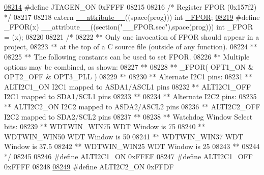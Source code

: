 \begin{DoxyCode}
\hypertarget{a00009_source_l08214}{}\hyperlink{a00009_aa569c0dc426e0de20ed4fccea7a75507}{08214} \textcolor{preprocessor}{#define JTAGEN\_ON            0xFFFF}
08215 
08216 \textcolor{comment}{/* Register FPOR (0x157f2)                               */}
08217 
08218 \textcolor{keyword}{extern} \hyperlink{a00009_a493c46f03454991ccc5aa7a6e1dfb2a7}{\_\_attribute\_\_}((space(prog))) int \hyperlink{a00009_a0d8fae652b4695a239f1ffffaff3f6b5}{\_FPOR};
\hypertarget{a00009_source_l08219}{}\hyperlink{a00009_a0d8fae652b4695a239f1ffffaff3f6b5}{08219} \textcolor{preprocessor}{#define \_FPOR(x) \_\_attribute\_\_((section("\_\_FPOR.sec"),space(prog))) int \_FPOR = (x);}
08220 
08221 \textcolor{comment}{/*}
08222 \textcolor{comment}{** Only one invocation of FPOR should appear in a project,}
08223 \textcolor{comment}{** at the top of a C source file (outside of any function).}
08224 \textcolor{comment}{**}
08225 \textcolor{comment}{** The following constants can be used to set FPOR.}
08226 \textcolor{comment}{** Multiple options may be combined, as shown:}
08227 \textcolor{comment}{**}
08228 \textcolor{comment}{** \_FPOR( OPT1\_ON & OPT2\_OFF & OPT3\_PLL )}
08229 \textcolor{comment}{**}
08230 \textcolor{comment}{**   Alternate I2C1 pins:}
08231 \textcolor{comment}{**     ALTI2C1\_ON           I2C1 mapped to ASDA1/ASCL1 pins}
08232 \textcolor{comment}{**     ALTI2C1\_OFF          I2C1 mapped to SDA1/SCL1 pins}
08233 \textcolor{comment}{**}
08234 \textcolor{comment}{**   Alternate I2C2 pins:}
08235 \textcolor{comment}{**     ALTI2C2\_ON           I2C2 mapped to ASDA2/ASCL2 pins}
08236 \textcolor{comment}{**     ALTI2C2\_OFF          I2C2 mapped to SDA2/SCL2 pins}
08237 \textcolor{comment}{**}
08238 \textcolor{comment}{**   Watchdog Window Select bits:}
08239 \textcolor{comment}{**     WDTWIN\_WIN75         WDT Window is 75%
08240 \textcolor{comment}{**     WDTWIN\_WIN50         WDT Window is 50%
08241 \textcolor{comment}{**     WDTWIN\_WIN37         WDT Window is 37.5%
08242 \textcolor{comment}{**     WDTWIN\_WIN25         WDT Window is 25%
08243 \textcolor{comment}{**}
08244 \textcolor{comment}{*/}
08245 
\hypertarget{a00009_source_l08246}{}\hyperlink{a00009_a95baf12ba194aaed055830b99394a9a7}{08246} \textcolor{preprocessor}{#define ALTI2C1\_ON           0xFFEF}
\hypertarget{a00009_source_l08247}{}\hyperlink{a00009_a4c4a083dcc5ff04c199c6bc5c7c60611}{08247} \textcolor{preprocessor}{#define ALTI2C1\_OFF          0xFFFF}
08248 
\hypertarget{a00009_source_l08249}{}\hyperlink{a00009_a2f39808381c7de9435d9a0ba15154716}{08249} \textcolor{preprocessor}{#define ALTI2C2\_ON           0xFFDF}
}}}}
\end{DoxyCode}
